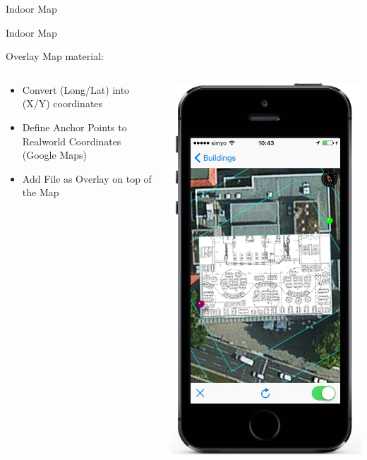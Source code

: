 \documentclass[11pt]{beamer}
\begin{document}
\begin{frame}{Indoor Map}
\end{frame}


\begin{frame}{Indoor Map}

Overlay Map material:

  \begin{columns}[T]
  \begin{column}{.6\textwidth}
  \begin{itemize}
    \item Convert (Long/Lat) into (X/Y) coordinates
    \item Define Anchor Points to Realworld Coordinates (Google Maps)
    \item Add File as Overlay on top of the Map
  \end{itemize}
  \end{column}
  \begin{column}{.4\textwidth}
  \includegraphics[scale=0.25]{mapsecondstep}

\end{column}
\end{columns}
\end{frame}
\end{document}
